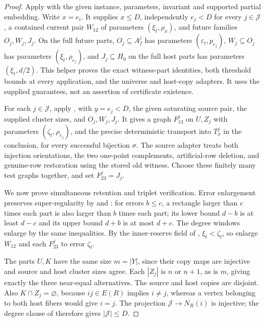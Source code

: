 \begin{proof}
Apply  with the given instance,
parameters, invariant and supported partial embedding. Write $x=e_i$.
It supplies $x\le D$, independently $e_j<D$ for every $j\in\mathcal J$,
a contained current pair $W_{12}$ of parameters $(\xi_t,\rho_x)$,
and future families $O_j,W_j,J_j$. On the full future parts,
$O_j\subseteq A_f^j$ has parameters $(\varepsilon_t,p_{e_j})$,
$W_j\subseteq O_j$ has parameters $(\xi_t,\rho_{e_j})$, and
$J_j\subseteq H_0$ on the full host parts has parameters $(\xi_t,d/2)$.
This helper proves the exact witness-part identities, both threshold
bounds at every application, and the universe and host-copy adapters.
It uses the supplied guarantees, not an assertion of certificate existence.

For each $j\in\mathcal J$, apply
, with $y=e_j<D$,
the given saturating source pair, the supplied cluster sizes, and
$O_j,W_j,J_j$. It gives a graph $F_{13}^j$ on $U,Z_j$ with parameters
$(\zeta_t,\rho_{e_j})$, and the precise deterministic transport into
$T^j_\sigma$ in the conclusion, for every successful bijection $\sigma$.
The source adapter treats both injection orientations, the two
one-point complements, artificial-row deletion, and genuine-row
restoration using the stored old witness. Choose these finitely many
test graphs together, and set $F_{23}^j=J_j$.

We now prove simultaneous retention and triplet verification.
Error enlargement preserves super-regularity by
 and : for errors
$b\le c$, a rectangle larger than $c$ times each part is also larger
than $b$ times each part; its lower bound $d-b$ is at least $d-c$
and its upper bound $d+b$ is at most $d+c$. The degree windows enlarge
by the same inequalities. By the inner-reserve field of
, $\xi_t<\zeta_t$, so enlarge
$W_{12}$ and each $F_{23}^j$ to error $\zeta_t$.

The parts $U,K$ have the same size $m=|Y|$, since their copy maps
are injective and source and host cluster sizes agree.
Each $|Z_j|$ is $n$ or $n+1$, as is $m$, giving exactly the three
near-equal alternatives. The source and host copies are disjoint.
Also $K\cap Z_j=\varnothing$, because $ij\in E(R)$ implies $i\ne j$,
whereas a vertex belonging to both host fibers would give $i=j$.
The projection $\mathcal J\to N_R(i)$ is injective; the degree clause
of  therefore gives
$|\mathcal J|\le D$.


\end{proof}
